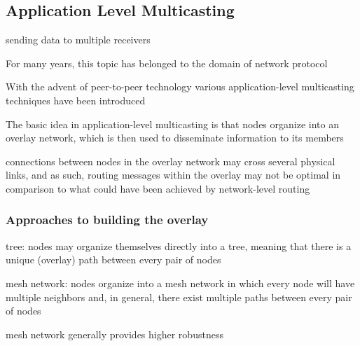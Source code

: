 \documentclass[ngerman,a4paper]{report}
\begin{document}
\subsection{Application Level Multicasting}

\begin{compactitem}
	\item sending data to multiple receivers
	\item For many years, this topic has belonged to the domain of network protocol
	\item With the advent of peer-to-peer technology various application-level multicasting techniques have been introduced
	\item The basic idea in application-level multicasting is that nodes organize into an overlay network, which is then used to disseminate information to its members
	\item connections between nodes in the overlay network may cross several physical links, and as such, routing messages within the overlay may not be optimal in comparison to what could have been achieved by network-level routing
\end{compactitem} 


\subsubsection*{Approaches to building the overlay}
\begin{compactitem}
	\item tree: nodes may organize themselves directly into a tree, meaning that there is a unique (overlay) path between every pair of nodes
	\item mesh network: nodes organize into a mesh network in which every node will have multiple neighbors and, in general, there exist multiple paths between every pair of nodes
	\item mesh network generally provides higher robustness
\end{compactitem}

\
\end{document}
